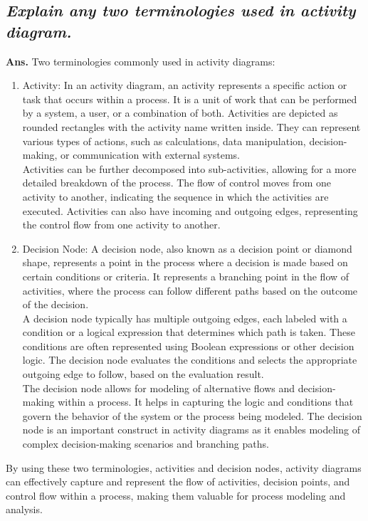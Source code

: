 \documentclass{article}
\begin{document}
\subsection{\textit{Explain any two terminologies used in activity diagram.}}
\textbf{Ans.} Two terminologies commonly used in activity diagrams:
\begin{enumerate}
	\item Activity: In an activity diagram, an activity represents a specific action or task that occurs within a process. It is a unit of work that can be performed by a system, a user, or a combination of both. Activities are depicted as rounded rectangles with the activity name written inside. They can represent various types of actions, such as calculations, data manipulation, decision-making, or communication with external systems.\\
	Activities can be further decomposed into sub-activities, allowing for a more detailed breakdown of the process. The flow of control moves from one activity to another, indicating the sequence in which the activities are executed. Activities can also have incoming and outgoing edges, representing the control flow from one activity to another.
	\item Decision Node: A decision node, also known as a decision point or diamond shape, represents a point in the process where a decision is made based on certain conditions or criteria. It represents a branching point in the flow of activities, where the process can follow different paths based on the outcome of the decision.\\
	A decision node typically has multiple outgoing edges, each labeled with a condition or a logical expression that determines which path is taken. These conditions are often represented using Boolean expressions or other decision logic. The decision node evaluates the conditions and selects the appropriate outgoing edge to follow, based on the evaluation result.\\
	The decision node allows for modeling of alternative flows and decision-making within a process. It helps in capturing the logic and conditions that govern the behavior of the system or the process being modeled. The decision node is an important construct in activity diagrams as it enables modeling of complex decision-making scenarios and branching paths.
\end{enumerate}
By using these two terminologies, activities and decision nodes, activity diagrams can effectively capture and represent the flow of activities, decision points, and control flow within a process, making them valuable for process modeling and analysis.
\end{document}
